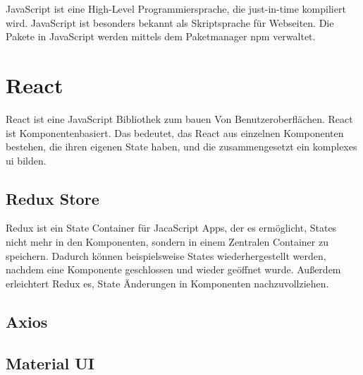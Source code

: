 JavaScript ist eine High-Level Programmiersprache, die just-in-time kompiliert wird.
JavaScript ist besonders bekannt als Skriptsprache für Webseiten.
Die Pakete in JavaScript werden mittels dem Paketmanager npm verwaltet.

\section{React}
\label{sec:react}

React ist eine JavaScript Bibliothek zum bauen Von Benutzeroberflächen.
React ist Komponentenbasiert.
Das bedeutet, das React aus einzelnen Komponenten bestehen, die ihren eigenen State haben, und die zusammengesetzt ein komplexes \ac{ui} bilden.
~\autocite{banks:react}


\subsection{Redux Store}
\label{sub:redux}

Redux ist ein State Container für JacaScript Apps, der es ermöglicht, States nicht mehr in den Komponenten, sondern in einem Zentralen Container zu speichern.
Dadurch können beispielsweise States wiederhergestellt werden, nachdem eine Komponente geschlossen und wieder geöffnet wurde.
Außerdem erleichtert Redux es, State Änderungen in Komponenten nachzuvollziehen.
~\autocite{freecodecamp:redux}

\subsection{Axios}
\label{sub:axios}

\subsection{Material UI}
\label{sub:mui}

